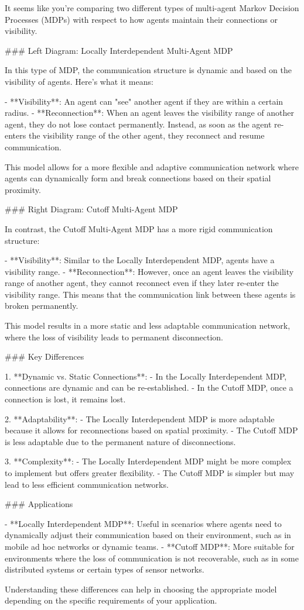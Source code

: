 It seems like you're comparing two different types of multi-agent Markov Decision Processes (MDPs) with respect to how agents maintain their connections or visibility.

### Left Diagram: Locally Interdependent Multi-Agent MDP

In this type of MDP, the communication structure is dynamic and based on the visibility of agents. Here’s what it means:

- **Visibility**: An agent can "see" another agent if they are within a certain radius.
- **Reconnection**: When an agent leaves the visibility range of another agent, they do not lose contact permanently. Instead, as soon as the agent re-enters the visibility range of the other agent, they reconnect and resume communication.

This model allows for a more flexible and adaptive communication network where agents can dynamically form and break connections based on their spatial proximity.

### Right Diagram: Cutoff Multi-Agent MDP

In contrast, the Cutoff Multi-Agent MDP has a more rigid communication structure:

- **Visibility**: Similar to the Locally Interdependent MDP, agents have a visibility range.
- **Reconnection**: However, once an agent leaves the visibility range of another agent, they cannot reconnect even if they later re-enter the visibility range. This means that the communication link between these agents is broken permanently.

This model results in a more static and less adaptable communication network, where the loss of visibility leads to permanent disconnection.

### Key Differences

1. **Dynamic vs. Static Connections**:
   - In the Locally Interdependent MDP, connections are dynamic and can be re-established.
   - In the Cutoff MDP, once a connection is lost, it remains lost.

2. **Adaptability**:
   - The Locally Interdependent MDP is more adaptable because it allows for reconnections based on spatial proximity.
   - The Cutoff MDP is less adaptable due to the permanent nature of disconnections.

3. **Complexity**:
   - The Locally Interdependent MDP might be more complex to implement but offers greater flexibility.
   - The Cutoff MDP is simpler but may lead to less efficient communication networks.

### Applications

- **Locally Interdependent MDP**: Useful in scenarios where agents need to dynamically adjust their communication based on their environment, such as in mobile ad hoc networks or dynamic teams.
- **Cutoff MDP**: More suitable for environments where the loss of communication is not recoverable, such as in some distributed systems or certain types of sensor networks.

Understanding these differences can help in choosing the appropriate model depending on the specific requirements of your application.